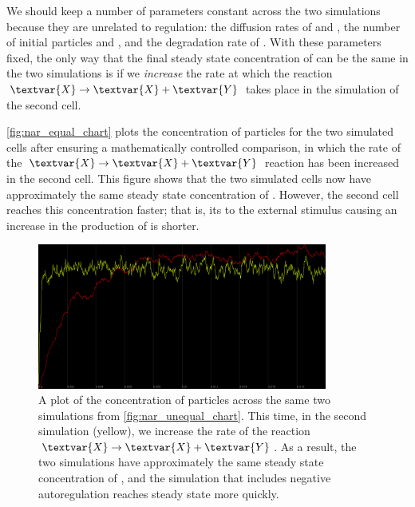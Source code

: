 \begin{qbox}\end{qbox}

We should keep a number of parameters constant across the two simulations because they are unrelated to regulation: the diffusion rates of  and , the number of initial particles  and , and the degradation rate of . With these parameters fixed, the only way that the final steady state concentration of  can be the same in the two simulations is if we \textit{increase} the rate at which the reaction $\textvar{X} \rightarrow \textvar{X} + \textvar{Y}$ takes place in the simulation of the second cell.

\autoref{fig:nar_equal_chart} plots the concentration of  particles for the two simulated cells after ensuring a mathematically controlled comparison, in which the rate of the $\textvar{X} \rightarrow \textvar{X} + \textvar{Y}$ reaction has been increased in the second cell. This figure shows that the two simulated cells now have approximately the same steady state concentration of . However, the second cell reaches this concentration faster; that is, its  to the external stimulus causing an increase in the production of  is shorter.

\begin{figure}[h]
\centering
\mySfFamily
\includegraphics[width = 0.85\textwidth]{../images/cellblender_nar_equal_chart.png}
\caption{A plot of the concentration of  particles across the same two simulations from \autoref{fig:nar_unequal_chart}. This time, in the second simulation (yellow), we increase the rate of the reaction $\textvar{X} \rightarrow \textvar{X} + \textvar{Y}$.  As a result, the two simulations have approximately the same steady state concentration of , and the simulation that includes negative autoregulation reaches steady state more quickly.}
\label{fig:nar_equal_chart}
\end{figure}


